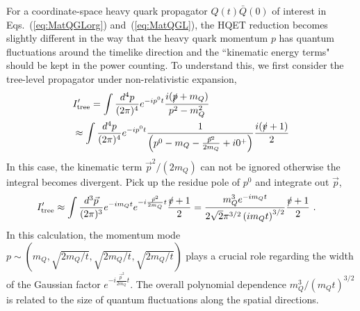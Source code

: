 \documentclass[a4paper,11pt]{article}
\begin{document}
For a coordinate-space heavy quark propagator $Q(t)\bar{Q}(0)$ of interest in Eqs.~(\ref{eq:MatQGLorg}) and~(\ref{eq:MatQGL}), the HQET reduction becomes slightly different in the way that the heavy quark momentum $p$ has quantum fluctuations around the timelike direction and the ``kinematic energy terms" should be kept in the power counting. To understand this, we first consider the tree-level propagator under non-relativistic expansion,
\begin{align}
&I'_{\rm tree} = \int \frac{d^4 p}{(2\pi)^4} e^{-i p^0 t} \frac{i (\slashed{p}+m_{Q})}{p^2-m_{Q}^2} \nonumber\\
&\approx \int \frac{d^4 p}{(2\pi)^4} e^{-i p^0 t} \frac{1}{\left(p^0 - m_{Q} - \frac{\vec{p}^2}{2 m_{Q}} + i 0^{+}\right)} \frac{i(\slashed{v}+1)}{2}
\end{align}
In this case, the kinematic term $\vec{p}^2/(2 m_{Q})$ can not be ignored otherwise the integral becomes divergent. Pick up the residue pole of $p^0$ and integrate out $\vec{p}$,
\begin{align}\label{eq:I'tree}
&I'_{\rm tree} \approx \int \frac{d^3 \vec{p}}{(2\pi)^3} e^{-i m_{Q} t} e^{-i \frac{\vec{p}^2}{2 m_{Q}} t} \frac{\slashed{v}+1}{2}   
= \frac{m_Q^3 e^{-i m_Q t}}{2 \sqrt{2} \pi ^{3/2} \left(i m_Q t\right)^{3/2}} \frac{\slashed{v}+1}{2} \ .
\end{align}
In this calculation, the momentum mode $p \sim \left(m_{Q},\sqrt{2m_{Q}/t},\sqrt{2m_{Q}/t},\sqrt{2m_{Q}/t}\right)$ plays a crucial role regarding the width of the Gaussian factor $e^{-i \frac{\vec{p}^2}{2 m_{Q}} t}$. The overall polynomial dependence $m_{Q}^3/\left(m_Q t\right)^{3/2}$ is related to the size of quantum fluctuations along the spatial directions.
\end{document}
